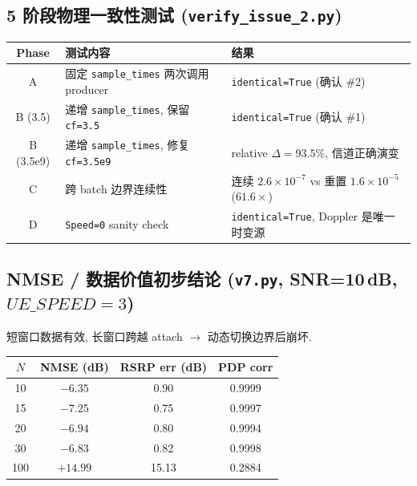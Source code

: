 \documentclass[11pt,a4paper,UTF8,fontset=fandol]{ctexart}
\newcommand{\vseven}{\texttt{v7.py}}
\begin{document}
\subsection{5 阶段物理一致性测试 (\texttt{verify\_issue\_2.py})}

\begin{center}
\renewcommand{\arraystretch}{1.25}
\begin{tabular}{c p{6.6cm} l}
\toprule
\textbf{Phase} & \textbf{测试内容} & \textbf{结果} \\
\midrule
A          & 固定 \texttt{sample\_times} 两次调用 producer
           & \texttt{identical=True} (确认 \#2) \\
B (3.5)    & 递增 \texttt{sample\_times}, 保留 \texttt{cf=3.5}
           & \texttt{identical=True} (确认 \#1) \\
B (3.5e9)  & 递增 \texttt{sample\_times}, 修复 \texttt{cf=3.5e9}
           & relative $\Delta=93.5\%$, 信道正确演变 \\
C          & 跨 batch 边界连续性
           & 连续 $2.6\times10^{-7}$ vs 重置 $1.6\times10^{-5}$ ($61.6\times$) \\
D          & \texttt{Speed=0} sanity check
           & \texttt{identical=True}, Doppler 是唯一时变源 \\
\bottomrule
\end{tabular}
\end{center}

\subsection{NMSE / 数据价值初步结论 (\vseven{}, SNR=10\,dB, $UE\_SPEED=3$)}

短窗口数据有效, 长窗口跨越 attach $\to$ 动态切换边界后崩坏.

\begin{center}
\renewcommand{\arraystretch}{1.20}
\begin{tabular}{c c c c}
\toprule
$N$ & NMSE (dB) & RSRP err (dB) & PDP corr \\
\midrule
10  & $-6.35$  & 0.90  & 0.9999 \\
15  & $-7.25$  & 0.75  & 0.9997 \\
20  & $-6.94$  & 0.80  & 0.9994 \\
30  & $-6.83$  & 0.82  & 0.9998 \\
100 & $+14.99$ & 15.13 & 0.2884 \\
\bottomrule
\end{tabular}
\end{center}
\end{document}
